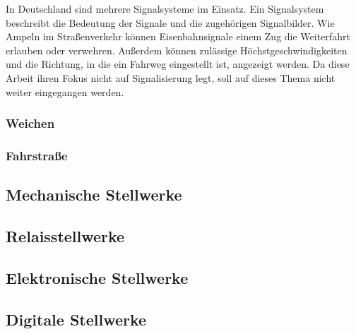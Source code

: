 In Deutschland sind mehrere Signalsysteme im Einsatz. Ein Signalsystem beschreibt die Bedeutung der Signale und die zugehörigen Signalbilder. Wie Ampeln im Straßenverkehr können Eisenbahnsignale einem Zug die Weiterfahrt erlauben oder verwehren. Außerdem können zulässige Höchstgeschwindigkeiten und die Richtung, in die ein Fahrweg eingestellt ist, angezeigt werden. Da diese Arbeit ihren Fokus nicht auf Signalisierung legt, soll auf dieses Thema nicht weiter eingegangen werden.

\subsubsection*{Weichen}\label{text:Grundlagen:Stellwerkstechnik:Sicherung-des-Schienenverkehrs:Weichen}

\subsubsection*{Fahrstraße}\label{text:Grundlagen:Stellwerkstechnik:Sicherung-des-Schienenverkehrs:Fahrstrasse}

\subsection{Mechanische Stellwerke}\label{text:Grundlagen:Stellwerkstechnik:Mechanische-Stellwerke}

\subsection{Relaisstellwerke}\label{text:Grundlagen:Stellwerkstechnik:Relaisstellwerke}

\subsection{Elektronische Stellwerke}\label{text:Grundlagen:Stellwerkstechnik:Elektronische-Stellwerke}

\subsection{Digitale Stellwerke}\label{text:Grundlagen:Stellwerkstechnik:Digitale-Stellwerke}
